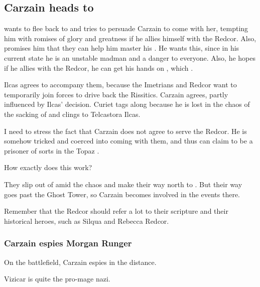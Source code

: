 \begin{garbage}
\subsection{Carzain heads to \Redce}
\Esmerel{} wants to flee back to \Redce{} and tries to persuade Carzain to come with her, tempting him with romises of glory and greatness if he allies himself with the Redcor. 
Also, \Esmerel{} promises him that they can help him master his \hs{\Kenosis}. 
He wants this, since in his current state he is an unstable madman and a danger to everyone. 
Also, he hopes if he allies with the Redcor, he can get his hands on , which . 

Ilcas agrees to accompany them, because the Imetrians and Redcor want to temporarily join forces to drive back the Rissitics. Carzain agrees, partly influenced by Ilcas' decision. Curiet tags along because he is lost in the chaos of the sacking of \Forklin{} and clings to Telcastora Ilcas. 

I need to stress the fact that Carzain does not agree to serve the Redcor. He is somehow tricked and coerced into coming with them, and thus can claim to be a prisoner of sorts in the Topaz \Chateau. 

How exactly does this work?

They slip out of \Forklin{} amid the chaos and make their way north to \Redce{}. 
But their way goes past the Ghost Tower, so Carzain becomes involved in the events there. 

Remember that the Redcor should refer a lot to their scripture and their historical heroes, such as Silqua and Rebecca Redcor. 





\subsubsection{Carzain espies Morgan Runger}
On the battlefield, Carzain espies  in the distance. 


Vizicar is quite the pro-mage nazi. 








\end{garbage}
